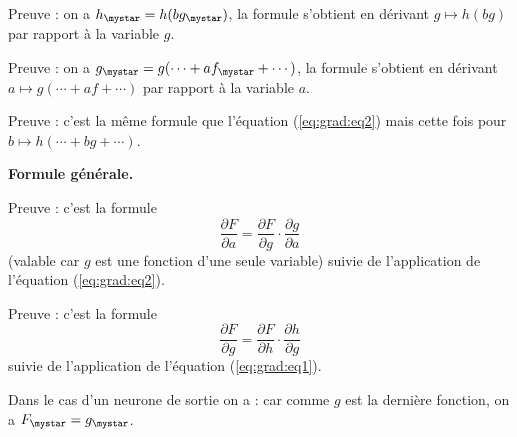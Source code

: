 \documentclass[11pt,class=report,crop=false]{standalone}
\begin{document}
Preuve : on a $h_\mystar = h(b g_\mystar)$, la formule s'obtient en dérivant $g \mapsto h(bg)$ par rapport à la variable $g$.

Preuve : on a $g_\mystar = g(\cdots + a f_\mystar+\cdots)$, la formule s'obtient en dérivant $a \mapsto g(\cdots + a f +\cdots)$ par rapport à la variable $a$.

Preuve : c'est la même formule que l'équation (\ref{eq:grad:eq2}) mais cette fois pour $b \mapsto h(\cdots + b g +\cdots)$.

\bigskip
\textbf{Formule générale.}


Preuve :
c'est la formule
$$\frac{\partial F}{\partial a} =  \frac{\partial F}{\partial g} \cdot \frac{\partial g}{\partial a}$$
(valable car $g$ est une fonction d'une seule variable) suivie de l'application de l'équation (\ref{eq:grad:eq2}).


Preuve :
c'est la formule
$$\frac{\partial F}{\partial g} =  \frac{\partial F}{\partial h} \cdot \frac{\partial h}{\partial g}$$
suivie de l'application de l'équation (\ref{eq:grad:eq1}).

Dans le cas d'un neurone de sortie on a :
car comme $g$ est la dernière fonction, on a $F_\mystar = g_\mystar$.
\end{document}
